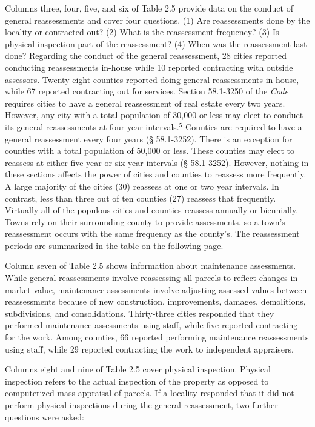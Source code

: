 \documentclass[
]{book}
\begin{document}
Columns three, four, five, and six of Table 2.5 provide data on the conduct of general reassessments and cover four questions. (1) Are reassessments done by the locality or contracted out? (2) What is the reassessment frequency? (3) Is physical inspection part of the reassessment? (4) When was the reassessment last done? Regarding the conduct of the general reassessment, 28 cities reported conducting reassessments in-house while 10 reported contracting with outside assessors. Twenty-eight counties reported doing general reassessments in-house, while 67 reported contracting out for services. Section 58.1-3250 of the \emph{Code} requires cities to have a general reassessment of real estate every two years. However, any city with a total population of 30,000 or less may elect to conduct its general reassessments at four-year intervals.\(^5\) Counties are required to have a general reassessment every four years (§ 58.1-3252). There is an exception for counties with a total population of 50,000 or less. These counties may elect to reassess at either five-year or six-year intervals (§ 58.1-3252). However, nothing in these sections affects the power of cities and counties to reassess more frequently. A large majority of the cities (30) reassess at one or two year intervals. In contrast, less than three out of ten counties (27) reassess that frequently. Virtually all of the populous cities and counties reassess annually or biennially. Towns rely on their surrounding county to provide assessments, so a town's reassessment occurs with the same frequency as the county's. The reassessment periods are summarized in the table on the following page.

Column seven of Table 2.5 shows information about maintenance assessments. While general reassessments involve reassessing all parcels to reflect changes in market value, maintenance assessments involve adjusting assessed values between reassessments because of new construction, improvements, damages, demolitions, subdivisions, and consolidations. Thirty-three cities responded that they performed maintenance assessments using staff, while five reported contracting for the work. Among counties, 66 reported performing maintenance reassessments using staff, while 29 reported contracting the work to independent appraisers.

Columns eight and nine of Table 2.5 cover physical inspection. Physical inspection refers to the actual inspection of the property as opposed to computerized mass-appraisal of parcels. If a locality responded that it did not perform physical inspections during the general reassessment, two further questions were asked:
\end{document}

